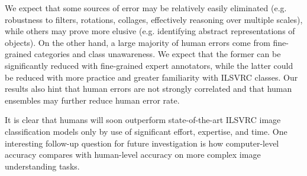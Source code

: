 We expect that some sources of error may be relatively easily eliminated (e.g. robustness to filters, rotations, collages, effectively reasoning over multiple scales), while others may prove more elusive (e.g. identifying abstract representations of objects). On the other hand, a large majority of human errors come from fine-grained categories and class unawareness. We expect that the former can be significantly reduced with fine-grained expert annotators, while the latter could be reduced with more practice and greater familiarity with ILSVRC classes. Our results also hint that human errors are not strongly correlated and that human ensembles may further reduce human error rate.

It is clear that humans will soon outperform state-of-the-art ILSVRC image classification models only by use of significant effort, expertise, and time. One interesting follow-up question for future investigation is how computer-level accuracy compares with human-level accuracy on more complex image understanding tasks.






